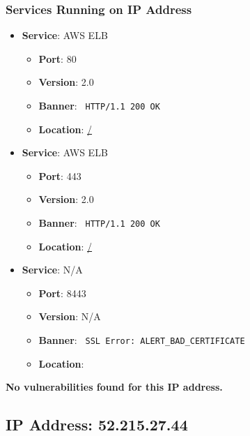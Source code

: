 \documentclass{article}
\begin{document}
\subsubsection*{Services Running on IP Address}

\begin{itemize}
    
        \item \textbf{Service}: AWS ELB
        \begin{itemize}
            \item \textbf{Port}: 80
            \item \textbf{Version}:  2.0 
            \item \textbf{Banner}: \texttt{
                HTTP/1.1 200 OK
            }
            \item \textbf{Location}: \href{ / }{ / }
        \end{itemize}
    
        \item \textbf{Service}: AWS ELB
        \begin{itemize}
            \item \textbf{Port}: 443
            \item \textbf{Version}:  2.0 
            \item \textbf{Banner}: \texttt{
                HTTP/1.1 200 OK
            }
            \item \textbf{Location}: \href{ / }{ / }
        \end{itemize}
    
        \item \textbf{Service}: N/A
        \begin{itemize}
            \item \textbf{Port}: 8443
            \item \textbf{Version}:  N/A 
            \item \textbf{Banner}: \texttt{
                SSL Error: ALERT\_BAD\_CERTIFICATE
            }
            \item \textbf{Location}: \href{  }{  }
        \end{itemize}
    
\end{itemize}


\textbf{No vulnerabilities found for this IP address.}




\clearpage



\subsection*{IP Address: 52.215.27.44}
\end{document}

